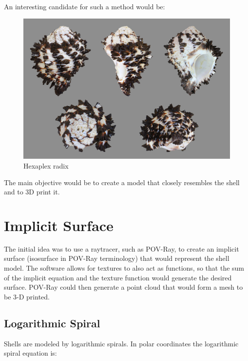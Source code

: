 \documentclass[a4paper]{article}
\begin{document}
An interesting candidate for such a method would be:

\begin{figure}[h]
	\centering\includegraphics[scale=0.25]{./img/hexaplex_radix.jpg}
	\caption{Hexaplex radix \cite{wikipedia-hexaplex}}
	\label{fig:hexaplex-radix} %
\end{figure}

The main objective would be to create a model that closely resembles the shell and to 3D print it.

\section{Implicit Surface}

The initial idea was to use a raytracer, such as POV-Ray, to create an implicit surface (isosurface in POV-Ray terminology) that would represent the shell model. The software allows for textures to also act as functions, so that the sum of the implicit equation and the texture function would generate the desired surface. POV-Ray could then generate a point cloud that would form a mesh to be 3-D printed.

\subsection{Logarithmic Spiral}

Shells are modeled by logarithmic spirals. In polar coordinates the logarithmic spiral equation is:
\end{document}
